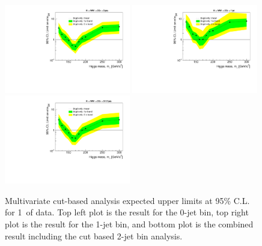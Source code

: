 \begin{figure}[!htbp]
\begin{center}
   \includegraphics[width=0.49\textwidth]{figures/limits_0j_1000pb_mva_1.pdf}
   \includegraphics[width=0.49\textwidth]{figures/limits_1j_1000pb_mva_1.pdf}
   \includegraphics[width=0.49\textwidth]{figures/limits_nj_1000pb_mva_1.pdf}
   \caption{Multivariate cut-based analysis expected upper limits at 95\% C.L. for 1\ifb\ of data. Top left plot 
   is the result for the 0-jet bin, top right plot is the result for the 1-jet bin, and 
   bottom plot is the combined result including the cut based 2-jet bin analysis.}
   \label{fig:mvabase_uls}
\end{center}
\end{figure}

